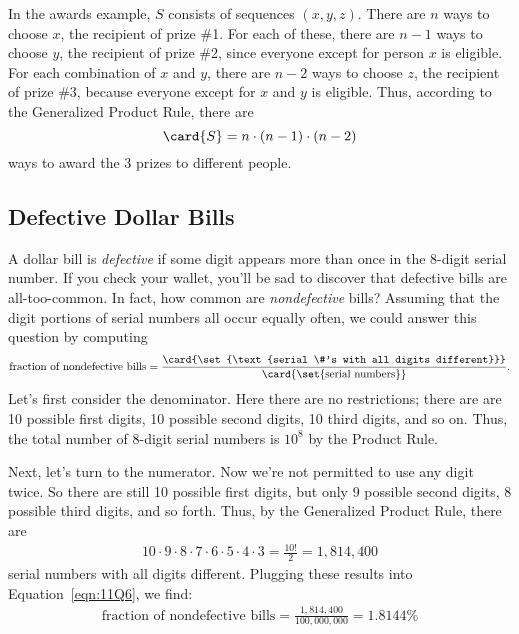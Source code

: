 In the awards example, $S$ consists of sequences $(x, y, z)$.  There
are $n$ ways to choose $x$, the recipient of prize \#1.  For each of
these, there are $n-1$ ways to choose $y$, the recipient of prize \#2,
since everyone except for person $x$ is eligible.  For each
combination of $x$ and $y$, there are $n-2$ ways to choose $z$, the
recipient of prize \#3, because everyone except for $x$ and $y$ is
eligible.  Thus, according to the Generalized Product Rule, there are
%
\[
\card{S} = n \cdot (n-1) \cdot (n-2)
\]
%
ways to award the 3 prizes to different people.

\subsection{Defective Dollar Bills}

A dollar bill is \emph{defective} if some digit appears
more than once in the 8-digit serial number.  If you check your
wallet, you'll be sad to discover that defective bills are
all-too-common.  In fact, how common are \emph{nondefective} bills?
Assuming that the digit portions of serial numbers all occur equally
often, we could answer this question by computing
%
\begin{equation}\label{eqn:11Q6}
\text{fraction of nondefective bills}
     = \frac{ \card{\set{\text{serial \#'s with all digits different}}} }
             { \card{\set{\text{serial numbers}}} }.
\end{equation}
%
Let's first consider the denominator.  Here there are no restrictions;
there are are 10 possible first digits, 10 possible second digits, 10
third digits, and so on.  Thus, the total number of 8-digit serial
numbers is $10^8$ by the Product Rule.

Next, let's turn to the numerator.  Now we're not permitted to use any
digit twice.  So there are still 10 possible first digits, but only 9
possible second digits, 8 possible third digits, and so forth.  Thus, by
the Generalized Product Rule, there are
%
\begin{align*}
10 \cdot 9 \cdot 8 \cdot 7 \cdot 6 \cdot 5 \cdot 4 \cdot 3
     = \frac{10!}{2} %
     = 1{,}814{,}400
\end{align*}
%
serial numbers with all digits different.  Plugging these results into
Equation~\ref{eqn:11Q6}, we find:
%
\begin{align*}
\text{fraction of nondefective bills}
     = \frac{1{,}814{,}400}{100{,}000{,}000} %
     = 1.8144\%
\end{align*}

